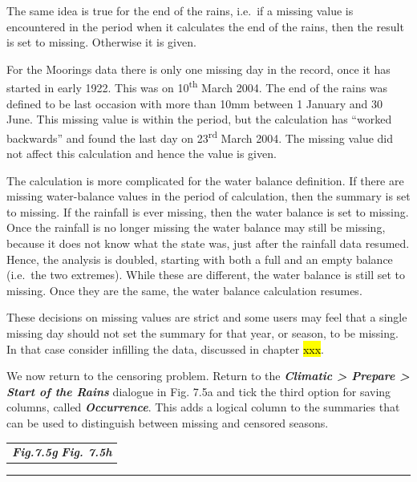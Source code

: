 \documentclass[
  letterpaper,
  DIV=11,
  numbers=noendperiod]{scrreprt}
\begin{document}
The same idea is true for the end of the rains, i.e.~if a missing value
is encountered in the period when it calculates the end of the rains,
then the result is set to missing. Otherwise it is given.

For the Moorings data there is only one missing day in the record, once
it has started in early 1922. This was on 10\textsuperscript{th} March
2004. The end of the rains was defined to be last occasion with more
than 10mm between 1 January and 30 June. This missing value is within
the period, but the calculation has ``worked backwards'' and found the
last day on 23\textsuperscript{rd} March 2004. The missing value did not
affect this calculation and hence the value is given.

The calculation is more complicated for the water balance definition. If
there are missing water-balance values in the period of calculation,
then the summary is set to missing. If the rainfall is ever missing,
then the water balance is set to missing. Once the rainfall is no longer
missing the water balance may still be missing, because it does not know
what the state was, just after the rainfall data resumed. Hence, the
analysis is doubled, starting with both a full and an empty balance
(i.e.~the two extremes). While these are different, the water balance is
still set to missing. Once they are the same, the water balance
calculation resumes.

These decisions on missing values are strict and some users may feel
that a single missing day should not set the summary for that year, or
season, to be missing. In that case consider infilling the data,
discussed in chapter \hl{xxx}.

We now return to the censoring problem. Return to the
\textbf{\emph{Climatic \textgreater{} Prepare \textgreater{} Start of
the Rains}} dialogue in Fig. 7.5a and tick the third option for saving
columns, called \textbf{\emph{Occurrence}}. This adds a logical column
to the summaries that can be used to distinguish between missing and
censored seasons.

\begin{longtable}[]{@{}l@{}}
\toprule\noalign{}
\endhead
\bottomrule\noalign{}
\endlastfoot
\textbf{\emph{Fig.7.5g}} \textbf{\emph{Fig. 7.5h}} \\
\end{longtable}

\begin{center}\rule{0.5\linewidth}{0.5pt}\end{center}
\end{document}
